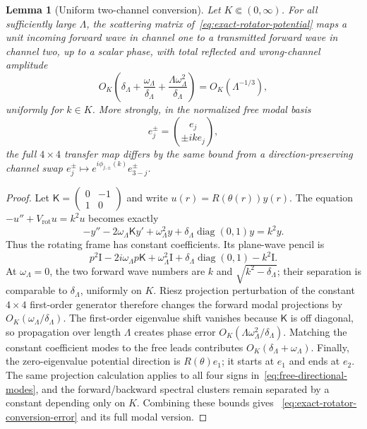 \documentclass[11pt]{article}
\newcommand{\Id}{\mathrm I}
\DeclareMathOperator{\diag}{diag}
\newtheorem{lemma}[theorem]{Lemma}
\theoremstyle{definition}
\theoremstyle{remark}
\begin{document}
\begin{lemma}[Uniform two-channel conversion]
\label{lem:exact-rotator-conversion}
Let $K\Subset(0,\infty)$.  For all sufficiently large $\Lambda$, the scattering
matrix of~\eqref{eq:exact-rotator-potential} maps a unit incoming forward wave
in channel one to a transmitted forward wave in channel two, up to a scalar
phase, with total reflected and wrong-channel amplitude
\begin{equation}
 O_K\!\left(\delta_\Lambda+
       \frac{\omega_\Lambda}{\delta_\Lambda}
       +\frac{\Lambda\omega_\Lambda^2}{\delta_\Lambda}\right)
 =O_K(\Lambda^{-1/3}),
 \label{eq:exact-rotator-conversion-error}
\end{equation}
uniformly for $k\in K$.  More strongly, in the normalized free modal basis
\begin{equation}
 e_j^\pm=\binom{e_j}{\pm ik e_j},
 \label{eq:free-directional-modes}
\end{equation}
the full $4\times4$ transfer map differs by the same bound from a
direction-preserving channel swap
$e_j^\pm\mapsto e^{i\phi_{j,\pm}(k)}e_{3-j}^\pm$.
\end{lemma}

\begin{proof}
Let
$\mathsf K=\left(\begin{smallmatrix}0&-1\\1&0\end{smallmatrix}\right)$
and write $u(r)=R(\theta(r))y(r)$.  The equation
$-u''+V_{\mathrm{rot}}u=k^2u$ becomes exactly
\begin{equation}
 -y''-2\omega_\Lambda\mathsf K y'
 +\omega_\Lambda^2y
 +\delta_\Lambda\diag(0,1)y=k^2y.
 \label{eq:exact-rotating-frame}
\end{equation}
Thus the rotating frame has constant coefficients.  Its plane-wave pencil is
\begin{equation}
 p^2\Id-2i\omega_\Lambda p\mathsf K+\omega_\Lambda^2\Id
 +\delta_\Lambda\diag(0,1)-k^2\Id.
 \label{eq:rotator-pencil}
\end{equation}
At $\omega_\Lambda=0$, the two forward wave numbers are $k$ and
$\sqrt{k^2-\delta_\Lambda}$; their separation is comparable to
$\delta_\Lambda$, uniformly on $K$.  Riesz projection perturbation of the
constant $4\times4$ first-order generator therefore changes the forward modal
projections by $O_K(\omega_\Lambda/\delta_\Lambda)$.  The first-order
eigenvalue shift vanishes because $\mathsf K$ is off diagonal, so propagation
over length $\Lambda$ creates phase error
$O_K(\Lambda\omega_\Lambda^2/\delta_\Lambda)$.  Matching the constant
coefficient modes to the free leads contributes $O_K(\delta_\Lambda+
\omega_\Lambda)$.  Finally, the zero-eigenvalue potential direction is
$R(\theta)e_1$; it starts at $e_1$ and ends at $e_2$.  The same projection
calculation applies to all four signs in~\eqref{eq:free-directional-modes}, and
the forward/backward spectral clusters remain separated by a constant
depending only on $K$.  Combining these bounds gives
~\eqref{eq:exact-rotator-conversion-error} and its full modal version.
\end{proof}
\end{document}

